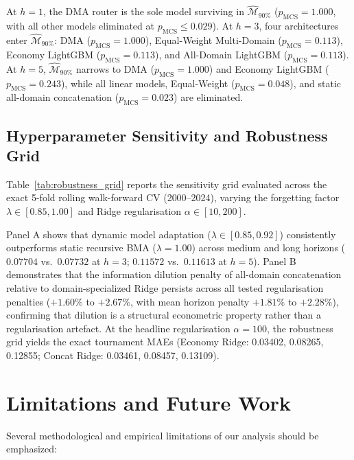 \documentclass[11pt,a4paper]{article}
\begin{document}


At $h=1$, the DMA router is the sole model surviving in $\widehat{\mathcal{M}}_{90\%}$ ($p_{\text{MCS}} = 1.000$, with all other models eliminated at $p_{\text{MCS}} \le 0.029$). At $h=3$, four architectures enter $\widehat{\mathcal{M}}_{90\%}$: DMA ($p_{\text{MCS}} = 1.000$), Equal-Weight Multi-Domain ($p_{\text{MCS}} = 0.113$), Economy LightGBM ($p_{\text{MCS}} = 0.113$), and All-Domain LightGBM ($p_{\text{MCS}} = 0.113$). At $h=5$, $\widehat{\mathcal{M}}_{90\%}$ narrows to DMA ($p_{\text{MCS}} = 1.000$) and Economy LightGBM ($p_{\text{MCS}} = 0.243$), while all linear models, Equal-Weight ($p_{\text{MCS}} = 0.048$), and static all-domain concatenation ($p_{\text{MCS}} = 0.023$) are eliminated.

\subsection{Hyperparameter Sensitivity and Robustness Grid}

Table~\ref{tab:robustness_grid} reports the sensitivity grid evaluated across the exact 5-fold rolling walk-forward CV (2000--2024), varying the forgetting factor $\lambda \in [0.85, 1.00]$ and Ridge regularisation $\alpha \in [10, 200]$.



Panel A shows that dynamic model adaptation ($\lambda \in [0.85, 0.92]$) consistently outperforms static recursive BMA ($\lambda = 1.00$) across medium and long horizons ($0.07704$ vs.\ $0.07732$ at $h=3$; $0.11572$ vs.\ $0.11613$ at $h=5$). Panel B demonstrates that the information dilution penalty of all-domain concatenation relative to domain-specialized Ridge persists across all tested regularisation penalties ($+1.60\%$ to $+2.67\%$, with mean horizon penalty $+1.81\%$ to $+2.28\%$), confirming that dilution is a structural econometric property rather than a regularisation artefact. At the headline regularisation $\alpha = 100$, the robustness grid yields the exact tournament MAEs (Economy Ridge: 0.03402, 0.08265, 0.12855; Concat Ridge: 0.03461, 0.08457, 0.13109).



\section{Limitations and Future Work}
\label{sec:limitations}

Several methodological and empirical limitations of our analysis should be emphasized:
\end{document}
